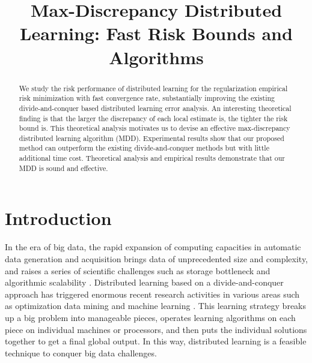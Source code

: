 \documentclass{article}
\title{Max-Discrepancy Distributed Learning: Fast Risk Bounds and Algorithms}
\author{
}
\begin{document}

\maketitle

\begin{abstract}
  We study the risk performance of distributed learning for the regularization empirical
  risk minimization with fast convergence rate,
  substantially improving the existing divide-and-conquer based distributed learning error analysis.
  An interesting theoretical finding is that the larger the discrepancy of each local estimate is, the tighter the risk bound is.
  This theoretical analysis motivates us to devise an effective max-discrepancy distributed learning algorithm (MDD).
  Experimental results show that our proposed method can outperform the existing divide-and-conquer methods
  but with little additional time cost.
  Theoretical analysis and empirical results demonstrate that our MDD  is sound and effective.
\end{abstract}
\section{Introduction}
In the era of big data, the rapid expansion of computing capacities in automatic data generation
and acquisition brings data of unprecedented size and complexity, and raises a series
of scientific challenges such as storage bottleneck and algorithmic scalability \cite{zhou2014big,Zhang2013,lin2017distributed}.
Distributed learning based on a divide-and-conquer approach has triggered enormous
recent research activities in various areas such as optimization \cite{zhang2012communication}
data mining \cite{wu2014data} and machine learning \cite{gillick2006mapreduce}.
This learning strategy breaks up a big problem into manageable
pieces, operates learning algorithms on each piece on individual machines or
processors, and then puts the individual solutions together to get a final global output.
In this way, distributed learning is a feasible technique to conquer big data challenges.
\end{document}

